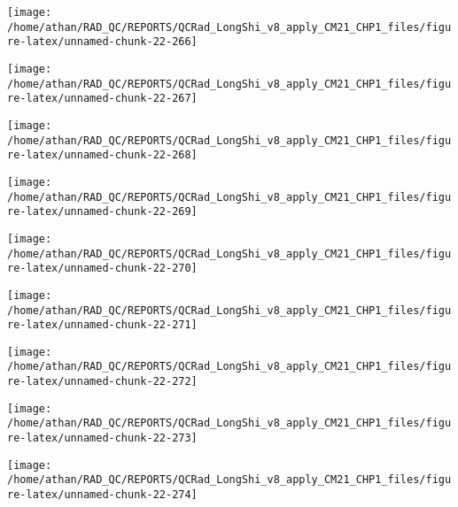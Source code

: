 \documentclass[
  10pt,
  a4paper,oneside]{article}
\begin{document}
\begin{center}\texttt{[image: /home/athan/RAD\_QC/REPORTS/QCRad\_LongShi\_v8\_apply\_CM21\_CHP1\_files/figure-latex/unnamed-chunk-22-266]} \end{center}

\begin{center}\texttt{[image: /home/athan/RAD\_QC/REPORTS/QCRad\_LongShi\_v8\_apply\_CM21\_CHP1\_files/figure-latex/unnamed-chunk-22-267]} \end{center}

\begin{center}\texttt{[image: /home/athan/RAD\_QC/REPORTS/QCRad\_LongShi\_v8\_apply\_CM21\_CHP1\_files/figure-latex/unnamed-chunk-22-268]} \end{center}

\begin{center}\texttt{[image: /home/athan/RAD\_QC/REPORTS/QCRad\_LongShi\_v8\_apply\_CM21\_CHP1\_files/figure-latex/unnamed-chunk-22-269]} \end{center}

\begin{center}\texttt{[image: /home/athan/RAD\_QC/REPORTS/QCRad\_LongShi\_v8\_apply\_CM21\_CHP1\_files/figure-latex/unnamed-chunk-22-270]} \end{center}

\begin{center}\texttt{[image: /home/athan/RAD\_QC/REPORTS/QCRad\_LongShi\_v8\_apply\_CM21\_CHP1\_files/figure-latex/unnamed-chunk-22-271]} \end{center}

\begin{center}\texttt{[image: /home/athan/RAD\_QC/REPORTS/QCRad\_LongShi\_v8\_apply\_CM21\_CHP1\_files/figure-latex/unnamed-chunk-22-272]} \end{center}

\begin{center}\texttt{[image: /home/athan/RAD\_QC/REPORTS/QCRad\_LongShi\_v8\_apply\_CM21\_CHP1\_files/figure-latex/unnamed-chunk-22-273]} \end{center}

\begin{center}\texttt{[image: /home/athan/RAD\_QC/REPORTS/QCRad\_LongShi\_v8\_apply\_CM21\_CHP1\_files/figure-latex/unnamed-chunk-22-274]} \end{center}
\end{document}
